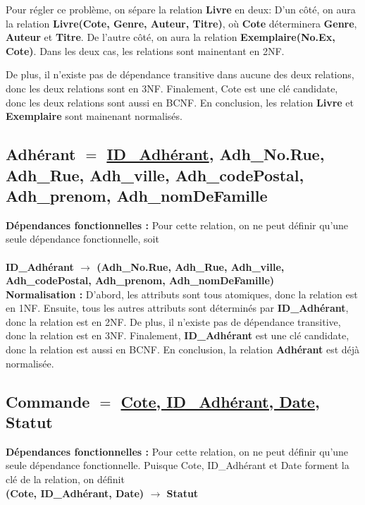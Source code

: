 \documentclass[12pt]{article}
\begin{document}
Pour régler ce problème, on sépare la relation \textbf{Livre} en deux: 
D'un côté, on aura la relation \textbf{Livre(Cote, Genre, Auteur, Titre)}, 
où \textbf{Cote} déterminera \textbf{Genre}, \textbf{Auteur} et \textbf{Titre}. 
De l'autre côté, on aura la relation \textbf{Exemplaire(No.Ex, Cote)}.  
Dans les deux cas, les relations sont mainentant en 2NF. 

De plus, il n’existe pas de dépendance transitive dans aucune des deux relations, donc les deux relations sont en 3NF.
Finalement, Cote est une clé candidate, donc les deux relations sont aussi en BCNF.
En conclusion, les relation \textbf{Livre} et \textbf{Exemplaire} sont mainenant normalisés.


\subsection*{\textbf{Adhérant} $=$ \underline{ID\_Adhérant}, Adh\_No.Rue, Adh\_Rue, Adh\_ville, Adh\_codePostal, Adh\_prenom, Adh\_nomDeFamille}

\textbf{Dépendances fonctionnelles :} Pour cette relation, on ne peut définir qu'une seule dépendance fonctionnelle, soit  \\ \\
\textbf{ID\_Adhérant $\rightarrow$ (Adh\_No.Rue, Adh\_Rue, Adh\_ville, Adh\_codePostal, Adh\_prenom, Adh\_nomDeFamille)} \\  

\textbf{Normalisation :} D'abord, les attributs sont tous atomiques, donc la relation est en 1NF. 
Ensuite, tous les autres attributs sont déterminés par  \textbf{ID\_Adhérant}, donc la relation est en 2NF. 
De plus, il n’existe pas de dépendance transitive, donc la relation est en 3NF. 
Finalement, \textbf{ID\_Adhérant} est une clé candidate, donc la relation est aussi en BCNF. 
En conclusion, la relation \textbf{Adhérant} est déjà normalisée.
        

\subsection*{\textbf{Commande} $=$ \underline{Cote, ID\_Adhérant, Date}, Statut}

\textbf{Dépendances fonctionnelles :} Pour cette relation, on ne peut définir qu'une seule dépendance fonctionnelle. 
Puisque Cote, ID\_Adhérant et Date forment la clé de la relation, on définit \\ 
\textbf{(Cote, ID\_Adhérant, Date) $\rightarrow$ Statut}
\end{document}
